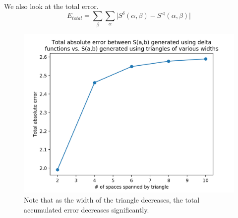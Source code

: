 \documentclass[10pt]{article}
\begin{document}
\begin{multicols}{2}
              
              We also look at the total error.
              \[E_{total}=\sum_{\beta}\sum_\alpha \Big|S^\delta(\alpha,\beta)-S^\triangleleft(\alpha,\beta)\Big|\]

            \begin{figure}[H]
              \begin{center}
              \includegraphics[scale=0.6]{diff_widths_total_error}
                \caption{Note that as the width of the triangle decreases, the total accumulated error decreases significantly.}
              \label{fig:diff_widths_total_error}
              \end{center}
            \end{figure}








            \clearpage

%  
%

\end{multicols}
\end{document}

